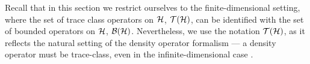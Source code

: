 Recall that in this section we restrict ourselves to the finite-dimensional setting, where the set of trace class operators on $\mathcal{H}$, $\mathcal{T}(\mathcal{H})$, can be identified with the set of bounded operators on $\mathcal{H}$, $\mathcal{B}(\mathcal{H})$.
Nevertheless, we use the notation $\mathcal{T}(\mathcal{H})$, as it reflects the natural setting of the density operator formalism --- a density operator must be trace-class, even in the infinite-dimensional case \cite{heinosaariMathematicalLanguageQuantum2011}.









